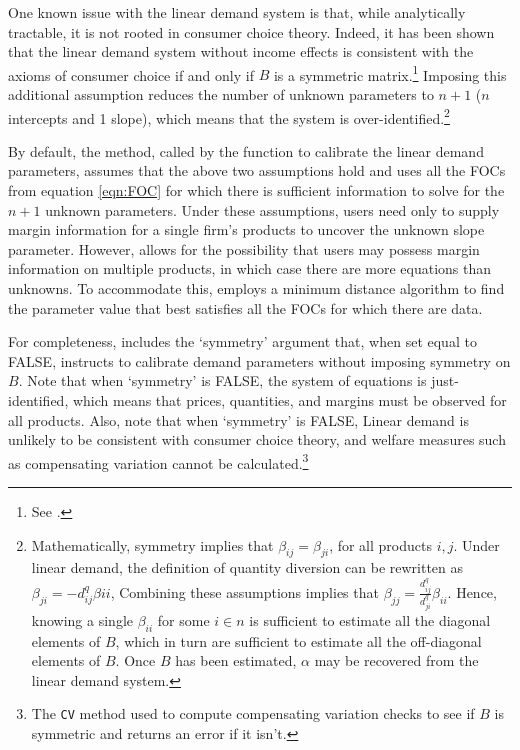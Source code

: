 \documentclass[11pt,numbers=noenddot,pointlessnumbers]{scrreprt}
\numberwithin{equation}{section}
\begin{document}
One known issue with the linear demand system is that, while
analytically tractable, it is not rooted in consumer choice
theory. Indeed, it has been shown
that the linear demand system without income effects is consistent
with the axioms of consumer choice if and only if $B$ is
a symmetric matrix.\footnote{See \cite{Haefen2002}.} Imposing this additional assumption reduces the number
of unknown parameters to $n+1$ ($n$ intercepts and 1 slope), which means that the system is
over-identified.\footnote{Mathematically, symmetry implies that
  $\beta_{ij}=\beta_{ji}$, for all products $i,j$. Under linear demand, the definition of
  quantity diversion can be rewritten as $\beta_{ji}=-d^q_{ij}\beta{ii}$,
  Combining these assumptions implies that
  $\beta_{jj}=\frac{d^q_{ij}}{d^q_{ji}}\beta_{ii}$. Hence, knowing a single
$\beta_{ii}$  for some $i\in n$ is sufficient to estimate all the diagonal elements of $B$, which
in turn are sufficient to estimate all the off-diagonal elements of
$B$. Once $B$ has been estimated, $\alpha$ may be recovered from the linear demand system.}



By default, the \verb@calcSlopes@ method, called by the \verb@linear@
function to calibrate the linear demand parameters, assumes that the above two
assumptions hold and uses all the FOCs from
equation \ref{eqn:FOC} for which there is sufficient information to
solve for the $n + 1$ unknown parameters. Under these assumptions,
users need only to supply margin information for a single firm's products to uncover
the unknown slope parameter. However, \verb@calcSlopes@
allows for the possibility that users may possess margin information
on multiple products, in which case there are
more equations than unknowns. To accommodate this,
\verb@calcSlopes@ employs a minimum distance algorithm to find the
parameter value that best satisfies all the FOCs for which there are data.


For completeness, \verb@linear@ includes the `symmetry' argument that,
when set equal to FALSE, instructs \verb@calcSlopes@ to calibrate demand parameters without imposing
symmetry on $B$. Note that when `symmetry' is FALSE, the system of
equations is just-identified, which means that prices, quantities, and
margins must be observed for all products. Also, note that when
`symmetry' is FALSE, Linear demand is unlikely to be consistent with
consumer choice theory, and welfare measures such as compensating
variation cannot be calculated.\footnote{The \texttt{CV} method used to
  compute compensating variation checks to
see if $B$ is symmetric and returns an error if it isn't.}
\end{document}
